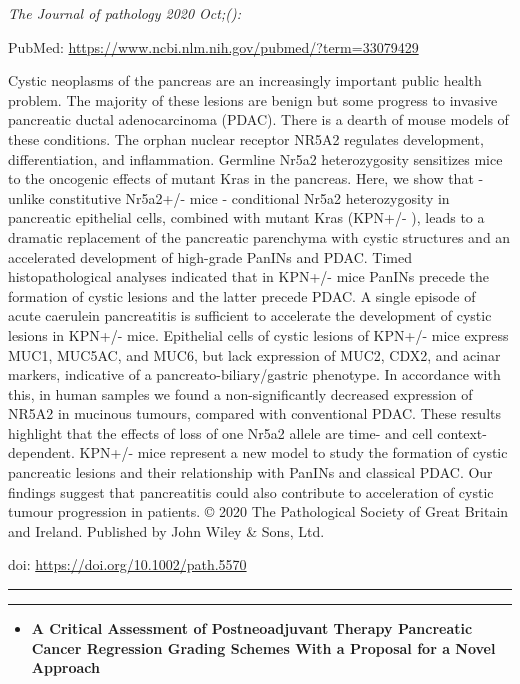 \documentclass[
]{article}
\providecommand{\tightlist}{%
  \setlength{\itemsep}{0pt}\setlength{\parskip}{0pt}}
\begin{document}
\emph{The Journal of pathology 2020 Oct;():}

PubMed: \url{https://www.ncbi.nlm.nih.gov/pubmed/?term=33079429}

Cystic neoplasms of the pancreas are an increasingly important public
health problem. The majority of these lesions are benign but some
progress to invasive pancreatic ductal adenocarcinoma (PDAC). There is a
dearth of mouse models of these conditions. The orphan nuclear receptor
NR5A2 regulates development, differentiation, and inflammation. Germline
Nr5a2 heterozygosity sensitizes mice to the oncogenic effects of mutant
Kras in the pancreas. Here, we show that - unlike constitutive Nr5a2+/-
mice - conditional Nr5a2 heterozygosity in pancreatic epithelial cells,
combined with mutant Kras (KPN+/- ), leads to a dramatic replacement of
the pancreatic parenchyma with cystic structures and an accelerated
development of high-grade PanINs and PDAC. Timed histopathological
analyses indicated that in KPN+/- mice PanINs precede the formation of
cystic lesions and the latter precede PDAC. A single episode of acute
caerulein pancreatitis is sufficient to accelerate the development of
cystic lesions in KPN+/- mice. Epithelial cells of cystic lesions of
KPN+/- mice express MUC1, MUC5AC, and MUC6, but lack expression of MUC2,
CDX2, and acinar markers, indicative of a pancreato-biliary/gastric
phenotype. In accordance with this, in human samples we found a
non-significantly decreased expression of NR5A2 in mucinous tumours,
compared with conventional PDAC. These results highlight that the
effects of loss of one Nr5a2 allele are time- and cell
context-dependent. KPN+/- mice represent a new model to study the
formation of cystic pancreatic lesions and their relationship with
PanINs and classical PDAC. Our findings suggest that pancreatitis could
also contribute to acceleration of cystic tumour progression in
patients. © 2020 The Pathological Society of Great Britain and Ireland.
Published by John Wiley \& Sons, Ltd.

doi: \url{https://doi.org/10.1002/path.5570}

\begin{center}\rule{0.5\linewidth}{0.5pt}\end{center}

\begin{center}\rule{0.5\linewidth}{0.5pt}\end{center}

\begin{itemize}
\tightlist
\item
  \textbf{A Critical Assessment of Postneoadjuvant Therapy Pancreatic
  Cancer Regression Grading Schemes With a Proposal for a Novel
  Approach}
\end{itemize}
\end{document}
